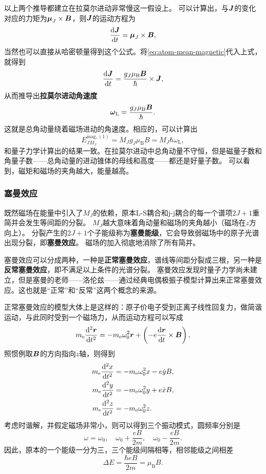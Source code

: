 \documentclass[UTF8, a4paper]{ctexart}
\begin{document}
以上两个推导都建立在拉莫尔进动非常慢这一假设上。
可以计算出，与$\vb*{J}$的变化对应的力矩为$\vb*{\mu}_J \times \vb*{B}$，则$\vb*{J}$的运动方程为
\[
    \dv{\vb*{J}}{t} = \vb*{\mu}_J \times \vb*{B},
\]
当然也可以直接从哈密顿量得到这个公式。将\eqref{eq:atom-mean-magnetic}代入上式，就得到
\[
    \dv{\vb*{J}}{t} = \frac{g_J \mu_\text{B} \vb*{B}}{\hbar} \times \vb*{J},
\]
从而推导出\textbf{拉莫尔进动角速度}
\begin{equation}
    \vb*{\omega}_\text{L} = \frac{g_J \mu_\text{B} \vb*{B}}{\hbar}.
\end{equation}
这就是总角动量绕着磁场进动的角速度。相应的，可以计算出
\begin{equation}
    E^{\text{mag}, (1)}_{JM_J} = M_J g_J \mu_\text{B} B = M_J \hbar \omega_\text{L},
    \label{eq:small-magnetic-gapping}
\end{equation}
和量子力学计算出的结果一致。在拉莫尔进动中总角动量不守恒，但是磁量子数和角量子数——总角动量的进动锥体的母线和高度——都还是好量子数。
可以看到，磁矩和磁场的夹角越大，能量越高。

\subsubsection{塞曼效应}

既然磁场在能量中引入了$M_J$的依赖，原本L-S耦合和j-j耦合的每一个谱项$2J+1$重简并会发生等间距的分裂。
$M_J$越大意味着角动量和磁场的夹角越小（磁场在$z$方向上）。
分裂产生的$2J+1$个子能级称为\textbf{塞曼能级}，它会导致弱磁场中的原子光谱出现分裂，即\textbf{塞曼效应}。
磁场的加入彻底地消除了所有简并。

塞曼效应可以分成两种，一种是\textbf{正常塞曼效应}，谱线等间距分裂成三根，另一种是\textbf{反常塞曼效应}，即不满足以上条件的光谱分裂。
塞曼效应发现时量子力学尚未建立，但是塞曼的老师——洛伦兹——通过经典电偶极振子模型计算出来正常塞曼效应。这也就是“正常”和“反常”这两个概念的来源。

正常塞曼效应的模型大体上是这样的：原子价电子受到正离子线性回复力，做简谐运动，与此同时受到一个磁场力，从而运动方程可以写成
\begin{equation}
    m_\text{e} \dv[2]{\vb*{r}}{t} = - m_\text{e} \omega_0^2 \vb*{r} + \left( - e \dv{\vb*{r}}{t} \times \vb*{B} \right),
\end{equation}
照惯例取$\vb*{B}$的方向指向$z$轴，则得到
\[
    \begin{aligned}
        m_\text{e} \dv[2]{x}{t} &= - m_\text{e} \omega_0^2 x - e \dot{y} B, \\
        m_\text{e} \dv[2]{y}{t} &= - m_\text{e} \omega_0^2 y + e \dot{x} B, \\
        m_\text{e} \dv[2]{z}{t} &= - m_\text{e} \omega_0^2 z.
    \end{aligned}
\]
考虑时谐解，并假定磁场非常小，则可以得到三个振动模式，圆频率分别是
\begin{equation}
    \omega = \omega_0, \quad \omega_0 + \frac{eB}{2m}, \quad \omega_0 - \frac{eB}{2m}.
\end{equation}
因此，原本的一个能级一分为三，三个能级间隔相等，相邻能级之间相差
\begin{equation}
    \Delta E = \frac{\hbar eB}{2m} = \mu_\text{B} B.
\end{equation}
\end{document}
